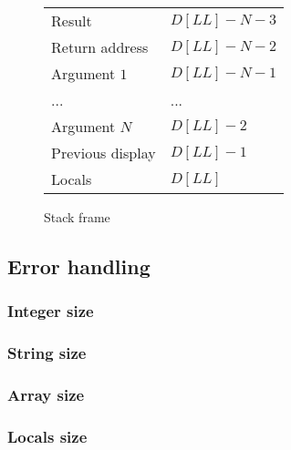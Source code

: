 \documentclass[oneside]{amsart}
\theoremstyle{definition}
\theoremstyle{remark}
\numberwithin{equation}{section}
\begin{document}
\begin{figure}[h]
\caption{Stack frame}
\begin{tabular}{l|l}
Result & $D[LL] - N - 3$ \\
Return address & $D[LL] - N - 2$  \\
Argument $1$ & $D[LL] - N - 1$  \\
... & ... \\
Argument $N$ & $D[LL] - 2$ \\
Previous display & $D[LL] - 1$ \\
Locals & $D[LL]$ \\
\end{tabular}
\label{fig:frame}
\end{figure}

\subsection{Error handling}
\subsubsection{Integer size}
\subsubsection{String size}
\subsubsection{Array size}
\subsubsection{Locals size}

\end{document}
